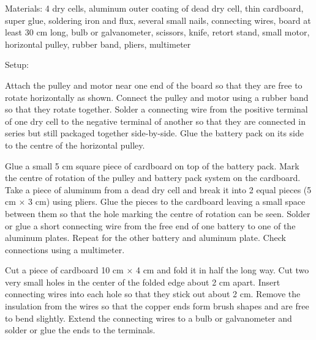 \begin{multicols}{2}

\begin{description*}
\item[Materials:]{4 dry cells, aluminum outer coating of dead dry cell, thin cardboard, super glue, soldering iron and flux, several small nails, connecting wires, board at least 30 cm long, bulb or galvanometer, scissors, knife, retort stand, small motor, horizontal pulley, rubber band, pliers, multimeter}
\item[Setup:]{Attach the pulley and motor near one end of the board so that they are free to rotate horizontally as shown. Connect the pulley and motor using a rubber band so that they rotate together. Solder a connecting wire from the positive terminal of one dry cell to the negative terminal of another so that they are connected in series but still packaged together side-by-side. Glue the battery pack on its side to the centre of the horizontal pulley. 

Glue a small 5 cm square piece of cardboard on top of the battery pack. Mark the centre of rotation of the pulley and battery pack system on the cardboard. Take a piece of aluminum from a dead dry cell and break it into 2 equal pieces (5 cm $\times$ 3 cm) using pliers. Glue the pieces to the cardboard leaving a small space between them so that the hole marking the centre of rotation can be seen. Solder or glue a short connecting wire from the free end of one battery to one of the aluminum plates. Repeat for the other battery and aluminum plate. Check connections using a multimeter. 

Cut a piece of cardboard 10 cm $\times$ 4 cm and fold it in half the long way. Cut two very small holes in the center of the folded edge about 2 cm apart. Insert connecting wires into each hole so that they stick out about 2 cm. Remove the insulation from the wires so that the copper ends form brush shapes and are free to bend slightly. Extend the connecting wires to a bulb or galvanometer and solder or glue the ends to the terminals.

}
\end{description*}
\end{multicols}
